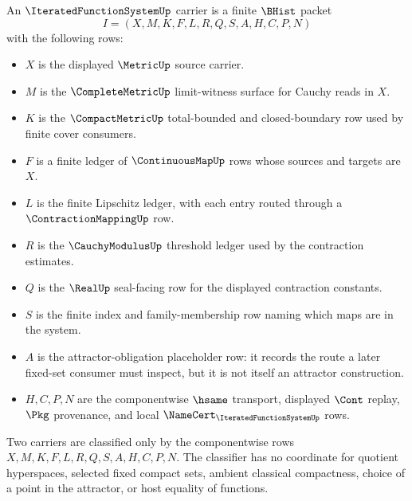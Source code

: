 \begin{definition}
\label{def:iterated-function-system-carrier}
An $\IteratedFunctionSystemUp$ carrier is a finite $\BHist$ packet
$$
I=(X,M,K,F,L,R,Q,S,A,H,C,P,N)
$$
with the following rows:
\begin{itemize}
\item $X$ is the displayed $\MetricUp$ source carrier.
\item $M$ is the $\CompleteMetricUp$ limit-witness surface for Cauchy reads in $X$.
\item $K$ is the $\CompactMetricUp$ total-bounded and closed-boundary row used by finite cover consumers.
\item $F$ is a finite ledger of $\ContinuousMapUp$ rows whose sources and targets are $X$.
\item $L$ is the finite Lipschitz ledger, with each entry routed through a $\ContractionMappingUp$ row.
\item $R$ is the $\CauchyModulusUp$ threshold ledger used by the contraction estimates.
\item $Q$ is the $\RealUp$ seal-facing row for the displayed contraction constants.
\item $S$ is the finite index and family-membership row naming which maps are in the system.
\item $A$ is the attractor-obligation placeholder row: it records the route a later fixed-set consumer must inspect, but it is not itself an attractor construction.
\item $H,C,P,N$ are the componentwise $\hsame$ transport, displayed $\Cont$ replay, $\Pkg$ provenance, and local $\NameCert_{\IteratedFunctionSystemUp}$ rows.
\end{itemize}
Two carriers are classified only by the componentwise rows $X,M,K,F,L,R,Q,S,A,H,C,P,N$. The classifier has no coordinate for quotient hyperspaces, selected fixed compact sets, ambient classical compactness, choice of a point in the attractor, or host equality of functions.
\end{definition}

